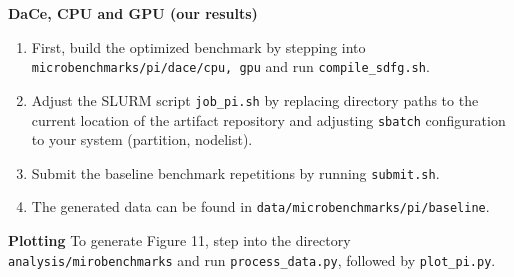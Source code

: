 \documentclass{article}
\begin{document}
\textbf{DaCe, CPU and GPU (our results)}

\begin{enumerate}
\item First, build the optimized benchmark by stepping into \texttt{microbenchmarks/pi/dace/{cpu, gpu}}
and run \texttt{compile\_sdfg.sh}.
\item Adjust the SLURM script \texttt{job\_pi.sh}
by replacing directory paths to the current location of the artifact repository and adjusting \texttt{sbatch}
configuration to your system (partition, nodelist).
\item Submit the baseline benchmark repetitions by running \texttt{submit.sh}.
\item The generated data can be found in \texttt{data/microbenchmarks/pi/baseline}.
\end{enumerate}

\textbf{Plotting}
%
To generate Figure 11, step into the directory \texttt{analysis/mirobenchmarks} and run \texttt{process\_data.py},
followed by \texttt{plot\_pi.py}.
\end{document}
